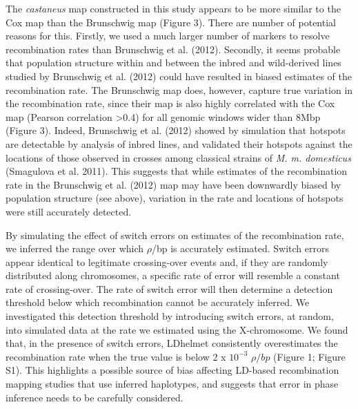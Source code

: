 The \textit{castaneus} map constructed in this study appears to be more similar to the Cox map than the Brunschwig map (Figure 3). There are number of potential reasons for this. Firstly, we used a much larger number of markers to resolve recombination rates than Brunschwig et al. (2012). Secondly, it seems probable that population structure within and between the inbred and wild-derived lines studied by Brunschwig et al. (2012) could have resulted in biased estimates of the recombination rate. The Brunschwig map does, however, capture true variation in the recombination rate, since their map is also highly correlated with the Cox map (Pearson correlation >0.4) for all genomic windows wider than 8Mbp (Figure 3). Indeed, Brunschwig et al. (2012) showed by simulation that hotspots are detectable by analysis of inbred lines, and validated their hotspots against the locations of those observed in crosses among classical strains of \textit{M. m. domesticus} (Smagulova et al. 2011). This suggests that while estimates of the recombination rate in the Brunschwig et al. (2012) map may have been downwardly biased by population structure (see above), variation in the rate and locations of hotspots were still accurately detected.
 
By simulating the effect of switch errors on estimates of the recombination rate, we inferred the range over which $\rho$/bp is accurately estimated. Switch errors appear identical to legitimate crossing-over events and, if they are randomly distributed along chromosomes, a specific rate of error will resemble a constant rate of crossing-over. The rate of switch error will then determine a detection threshold below which recombination cannot be accurately inferred. We investigated this detection threshold by introducing switch errors, at random, into simulated data at the rate we estimated using the X-chromosome. We found that, in the presence of switch errors, LDhelmet consistently overestimates the recombination rate when the true value is below 2 x $10^{-3}$ $\rho /bp$ (Figure 1; Figure S1). This highlights a possible source of bias affecting LD-based recombination mapping studies that use inferred haplotypes, and suggests that error in phase inference needs to be carefully considered.

